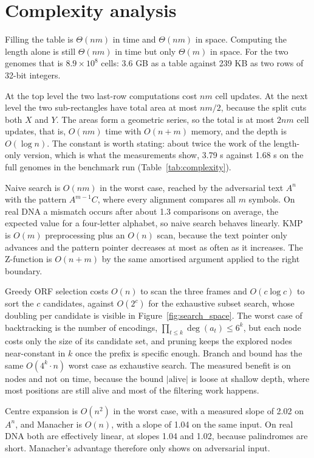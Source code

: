 \section{Complexity analysis}\label{sec:complexity}

Filling the table is $\Theta(nm)$ in time and $\Theta(nm)$ in space. Computing the length alone is
still $\Theta(nm)$ in time but only $\Theta(m)$ in space. For the two genomes that is
$8.9 \times 10^8$ cells: 3.6 GB as a table against 239 KB as two rows of 32-bit integers.


At the top level the two last-row computations cost $nm$ cell updates. At the next level the two
sub-rectangles have total area at most $nm / 2$, because the split cuts both $X$ and $Y$. The areas
form a geometric series, so the total is at most $2nm$ cell updates, that is, $O(nm)$ time with
$O(n + m)$ memory, and the depth is $O(\log n)$. The constant is worth stating: about twice the work
of the length-only version, which is what the measurements show, 3.79 s against 1.68 s on the full
genomes in the benchmark run (Table~\ref{tab:complexity}).

Naive search is $O(nm)$ in the worst case, reached by the adversarial text $A^n$ with the pattern
$A^{m-1}C$, where every alignment compares all $m$ symbols. On real DNA a mismatch occurs after about
1.3 comparisons on average, the expected value for a four-letter alphabet, so naive search behaves
linearly. KMP is $O(m)$ preprocessing plus an $O(n)$ scan, because the text pointer only advances and
the pattern pointer decreases at most as often as it increases. The Z-function is $O(n + m)$ by the
same amortised argument applied to the right boundary.

Greedy ORF selection costs $O(n)$ to scan the three frames and $O(c \log c)$ to sort the $c$
candidates, against $O(2^c)$ for the exhaustive subset search, whose doubling per candidate is
visible in Figure~\ref{fig:search_space}. The worst case of backtracking is the number of encodings,
$\prod_{t \le k} \deg(a_t) \le 6^k$, but each node costs only the size of its candidate set, and
pruning keeps the explored nodes near-constant in $k$ once the prefix is specific enough. Branch and
bound has the same $O(4^k \cdot n)$ worst case as exhaustive search. The measured benefit is on nodes
and not on time, because the bound $|\text{alive}|$ is loose at shallow depth, where most positions
are still alive and most of the filtering work happens.

Centre expansion is $O(n^2)$ in the worst case, with a measured slope of 2.02 on $A^n$, and
Manacher is $O(n)$, with a slope of 1.04 on the same input. On real DNA both are effectively linear,
at slopes 1.04 and 1.02, because palindromes are short. Manacher's advantage therefore only shows on
adversarial input.
